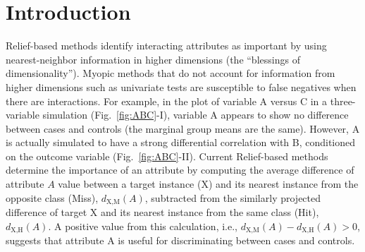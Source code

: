 \documentclass[10pt,letterpaper]{article}\usepackage[]{graphicx}\usepackage[]{color}
\begin{document}
\linenumbers

\section*{Introduction}

Relief-based methods identify interacting attributes as important by using nearest-neighbor information in higher dimensions (the ``blessings of dimensionality''). Myopic methods that do not account for information from higher dimensions such as univariate tests are susceptible to false negatives when there are interactions. For example, in the plot of variable A versus C in a three-variable simulation (Fig.~\ref{fig:ABC}-I), variable A appears to show no difference between cases and controls (the marginal group means are the same). However, A is actually simulated to have a strong differential correlation with B, conditioned on the outcome variable (Fig.~\ref{fig:ABC}-II). Current Relief-based methods determine the importance of an attribute by computing the average difference of attribute $A$ value between a target instance (X) and its nearest instance from the opposite class (Miss), $d_{\text{X,M}}(A)$, subtracted from the similarly projected difference of target X and its nearest instance from the same class (Hit), $d_{\text{X,H}}(A)$. A positive value from this calculation, i.e., $d_{\text{X,M}}(A)-d_{\text{X,H}}(A) > 0$, suggests that attribute A is useful for discriminating between cases and controls.  
\end{document}
